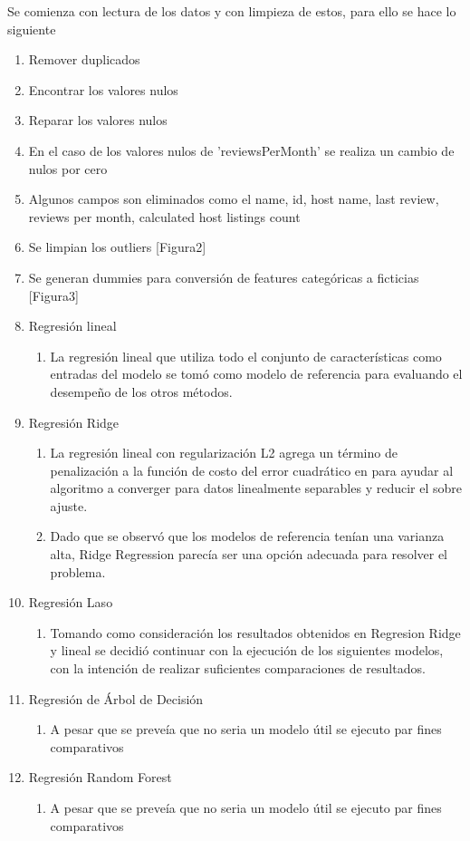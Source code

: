 \documentclass[conference]{IEEEtran}
\begin{document}
Se comienza con lectura de los datos y con limpieza de estos, para ello se hace lo siguiente 
\begin{enumerate}
    \item Remover duplicados
    \item Encontrar los valores nulos
    \item Reparar los valores nulos 
    \item En el caso de los valores nulos de 'reviewsPerMonth' se realiza un cambio de nulos por cero
    \item Algunos campos son eliminados como el name, id, host name, last review, reviews per month, calculated host listings count
    \item Se limpian los outliers [Figura2]
    \item Se generan dummies para conversión de features categóricas a ficticias [Figura3]
    \item Regresión lineal
      \begin{enumerate}
        \item La regresión lineal que utiliza todo el conjunto de características como entradas del modelo se tomó como modelo de referencia para
        evaluando el desempeño de los otros métodos.
      \end{enumerate}
    \item Regresión Ridge
      \begin{enumerate}
        \item La regresión lineal con regularización L2 agrega un término de penalización a la función de costo del error cuadrático en
        para ayudar al algoritmo a converger para datos linealmente separables y reducir el sobre ajuste.
        \item Dado que se observó que los modelos de referencia tenían una varianza alta, Ridge Regression parecía ser una opción adecuada para resolver el problema.
      \end{enumerate}
    \item Regresión Laso
      \begin{enumerate}
        \item Tomando como consideración los resultados obtenidos en Regresion Ridge y lineal se decidió continuar con la ejecución de los siguientes modelos, con la intención de realizar suficientes comparaciones de resultados.
      \end{enumerate}
    \item Regresión de Árbol de Decisión
      \begin{enumerate}
        \item A pesar que se preveía que no seria un modelo útil se ejecuto par fines comparativos
      \end{enumerate}
    \item Regresión Random Forest
      \begin{enumerate}
        \item A pesar que se preveía que no seria un modelo útil se ejecuto par fines comparativos
      \end{enumerate}
\end{enumerate}
\end{document}
